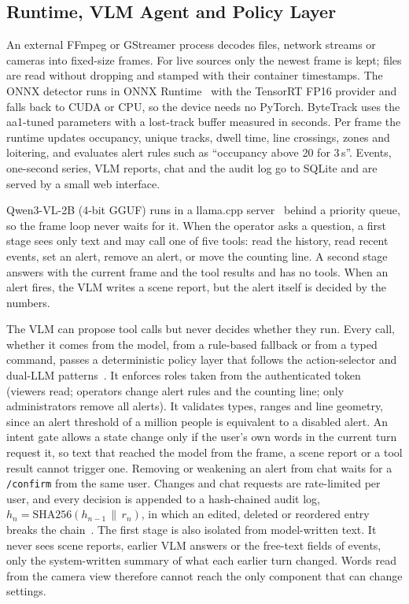 \subsection{Runtime, VLM Agent and Policy Layer}
\label{sec:edge}
An external FFmpeg or GStreamer process decodes files, network streams or cameras into fixed-size frames. For live
sources only the newest frame is kept; files are read without dropping and stamped with their container timestamps.
The ONNX detector runs in ONNX Runtime~\cite{onnxruntime} with the TensorRT FP16 provider and falls back to CUDA or
CPU, so the device needs no PyTorch. ByteTrack uses the aa1-tuned parameters with a lost-track buffer measured in
seconds. Per frame the runtime updates occupancy, unique tracks, dwell time, line crossings, zones and loitering, and
evaluates alert rules such as ``occupancy above 20 for 3\,s''. Events, one-second series, VLM reports, chat and the
audit log go to SQLite and are served by a small web interface.

Qwen3-VL-2B (4-bit GGUF) runs in a llama.cpp server~\cite{llamacpp} behind a priority queue, so the frame loop never
waits for it. When the operator asks a question, a first stage sees only text and may call one of five tools: read
the history, read recent events, set an alert, remove an alert, or move the counting line. A second stage answers with the current frame and the tool results and has no tools.
When an alert fires, the VLM writes a scene report, but the alert itself is decided by the numbers.

The VLM can propose tool calls but never decides whether they run. Every call, whether it comes from the model, from
a rule-based fallback or from a typed command, passes a deterministic policy layer that follows the action-selector
and dual-LLM patterns~\cite{beurerkellner2025patterns}. It enforces roles taken from the authenticated token
(viewers read; operators change alert rules and the counting line; only administrators remove all alerts). It
validates types, ranges and line geometry, since an alert threshold of a million people is equivalent to a disabled alert.
An intent gate allows a state change only if the user's own words in the current turn request it, so text that
reached the model from the frame, a scene report or a tool result cannot trigger one. Removing or weakening an alert
from chat waits for a \texttt{/confirm} from the same user. Changes and chat requests are rate-limited per user,
and every decision is appended to a hash-chained audit log, $h_n = \mathrm{SHA256}(h_{n-1}\,\|\,r_n)$, in which an
edited, deleted or reordered entry breaks the chain~\cite{schneier1999audit}. The first stage is also isolated from
model-written text. It never sees scene reports, earlier VLM answers or the free-text fields of events, only the
system-written summary of what each earlier turn changed. Words read from the camera view therefore cannot reach the
only component that can change settings.
